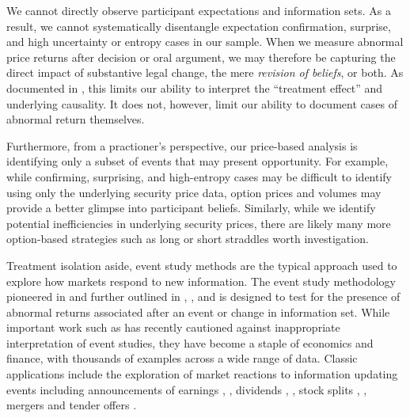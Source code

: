 \documentclass[preprint,12pt]{elsarticle}
\begin{document}
We cannot directly observe participant expectations and information sets.  As a result, we cannot systematically disentangle expectation confirmation, surprise, and high uncertainty or entropy cases in our sample.  When we measure abnormal price returns after decision or oral argument,  we may therefore be capturing the direct impact of substantive legal change, the mere \textit{revision of beliefs}, or both.  As documented in \cite{hennessy2015beyond}, this limits our ability to interpret the ``treatment effect'' and underlying causality.  It does not, however, limit our ability to document cases of abnormal return themselves.  

Furthermore, from a practioner's perspective, our price-based analysis is identifying only a subset of events that may present opportunity.  For example, while confirming, surprising, and high-entropy cases may be difficult to identify using only the underlying security price data, option prices and volumes may provide a better glimpse into participant beliefs.  Similarly, while we identify potential inefficiencies in underlying security prices, there are likely many more option-based strategies such as long or short straddles worth investigation.

Treatment isolation aside, event study methods are the typical approach used to explore how markets respond to new information.  The event study methodology pioneered in \cite{fama1969adjustment} and further outlined in \cite{brown1985using}, \cite{campbell1997econometrics}, \cite{mackinlay1997event} and \cite{bhagat2002event} is designed to test for the presence of abnormal returns associated after an event or change in information set.  While important work such as \cite{hennessy2015beyond} has recently cautioned against inappropriate interpretation of event studies,  they have become a staple of economics and finance, with thousands of examples across a wide range of data.  Classic applications include the exploration of market reactions to information updating events including announcements of earnings \cite{firth1976impact}, \cite{patell1981ex}, dividends \cite{kalay1985predictable}, \cite{kalay1986informational}, stock splits \cite{charest1978split}, \cite{lamoureux1987market}, mergers \cite{asquith1983merger} and tender offers \cite{dodd1977tender}.   
\end{document}
